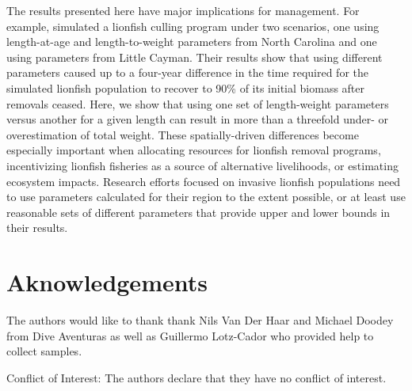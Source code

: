 \documentclass[fleqn,10pt,lineno]{wlpeerj} %
\begin{document}
The results presented here have major implications for management. For
example, \citet{edwards_2014} simulated a lionfish culling program under
two scenarios, one using length-at-age and length-to-weight parameters
from North Carolina and one using parameters from Little Cayman. Their
results show that using different parameters caused up to a four-year
difference in the time required for the simulated lionfish population to
recover to 90\% of its initial biomass after removals ceased. Here, we
show that using one set of length-weight parameters versus another for a
given length can result in more than a threefold under- or
overestimation of total weight. These spatially-driven differences
become especially important when allocating resources for lionfish
removal programs, incentivizing lionfish fisheries as a source of
alternative livelihoods, or estimating ecosystem impacts. Research
efforts focused on invasive lionfish populations need to use parameters
calculated for their region to the extent possible, or at least use
reasonable sets of different parameters that provide upper and lower
bounds in their results.

\section*{Aknowledgements}

The authors would like to thank thank Nils Van Der Haar and Michael
Doodey from Dive Aventuras as well as Guillermo Lotz-Cador who provided
help to collect samples.

Conflict of Interest: The authors declare that they have no conflict of
interest.


\end{document}
